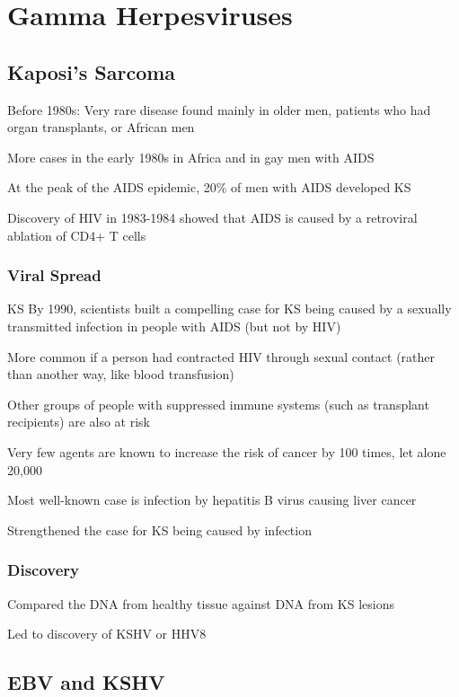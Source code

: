 \documentclass{notes}
\begin{document}
\section{Gamma Herpesviruses}

\subsection{Kaposi's Sarcoma}

Before 1980s: Very rare disease found mainly in older men, patients who had organ transplants, or African men

More cases in the early 1980s in Africa and in gay men with AIDS

\tab \indicates At the peak of the AIDS epidemic, 20\% of men with AIDS developed KS

Discovery of HIV in 1983-1984 showed that AIDS is caused by a retroviral ablation of CD4+ T cells

\subsubsection{Viral Spread}

KS By 1990, scientists built a compelling case for KS being caused by a sexually transmitted infection in people with AIDS (but not by HIV)

\tab More common if a person had contracted HIV through sexual contact (rather than another way, like blood transfusion)

Other groups of people with suppressed immune systems (such as transplant recipients) are also at risk

Very few agents are known to increase the risk of cancer by 100 times, let alone 20,000

\tab Most well-known case is infection by hepatitis B virus causing liver cancer

\tab \indicates Strengthened the case for KS being caused by infection

\subsubsection{Discovery}

Compared the DNA from healthy tissue against DNA from KS lesions

Led to discovery of KSHV or HHV8

\subsection{EBV and KSHV}
\end{document}
